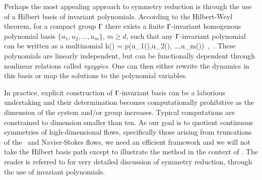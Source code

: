 Perhaps the most appealing approach to symmetry reduction is
through the use of a Hilbert basis of invariant polynomials.
According to the Hilbert-Weyl theorem, 
for a compact group $\Gamma$ there exists a finite
$\Gamma${-invariant} homogenous polynomial basis
$\{u_1,u_2, \dots,u_m\}$, $ m \geq d$,
such that any $\Gamma${-invariant} polynomial
can be written as a multinomial
\beq
h(\ssp) = p(u_1(\ssp),u_2(\ssp), \dots,u_m(\ssp))
    \,,\qquad \ssp \in \pS
\,.
These polynomials are linearly
independent, but can be functionally dependent through
nonlinear relations called \emph{syzygies}.
One can then either rewrite the dynamics in this basis
or map the solutions to the polynomial variables.

In practice, explicit construction of $\Gamma${-invariant} basis
can be a laborious undertaking and their determination becomes 
computationally prohibitive as the dimension of the system and/or group
increases. Typical
computations are constrained to dimension smaller than ten.
As our goal is to quotient continuous symmetries of
high-dimensional flows, specifically those arising from
truncations of the \KS\ and Navier-Stokes flows, 
we need an efficient framework and we will not take the Hilbert basis 
path except to illustrate the method in the context of \cLe.
The reader is referred to 
for very detailed discussion of symmetry reduction, through
the use of invariant polynomials.
